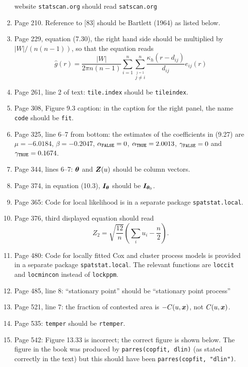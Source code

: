\documentclass[12pt,a4paper]{article}
\newcommand{\boldmaths}[1]{{\ensuremath\boldsymbol{#1}}}
\newcommand{\bx}{\boldmaths x}
\newcommand{\bZ}{\boldmaths Z}
\newcommand{\btheta}{\boldmaths\theta}
\newcommand{\suminej}{\sum_{i=1}^n \sum_{\stackrel{j=1}{\!\!j \neq i}}^n}
\begin{document}
\begin{enumerate}
 website \texttt{statscan.org} should read \texttt{satscan.org}
\item Page 210. Reference to [83] should be Bartlett (1964)
  as listed below.
\item Page 229, equation (7.30), the right hand side should
  be multiplied by $|W|/(n(n-1))$, so that the equation reads
  \[
  \widehat g(r) = \frac {|W|}{2\pi n(n-1)}
  \suminej \frac{
    \kappa_h(r - d_{ij})
  }{
    d_{ij}
  } e_{ij}(r)
  \]
\item Page 261, line 2 of text: 
\texttt{tile.index} should be \texttt{tileindex}.
\item Page 308, Figure 9.3 caption: in the caption for the right panel,
the name \texttt{code} should be \texttt{fit}.
\item Page 325, line 6--7 from bottom: the estimates of the coefficients
  in (9.27) are $\mu =-6.0184$, $\beta=-0.2047$,
  $\alpha_{\mbox{\scriptsize \texttt{FALSE}}} = 0$,
  $\alpha_{\mbox{\scriptsize \texttt{TRUE}}} = 2.0013$,
  $\gamma_{\mbox{\scriptsize \texttt{FALSE}}} = 0$ and
  $\gamma_{\mbox{\scriptsize \texttt{TRUE}}} = 0.1674$.
\item Page 344, lines 6--7: $\btheta$ and $\bZ(u)$ 
should be column vectors.
\item Page 374, in equation (10.3), ${\boldmaths I}_\btheta$
  should be ${\boldmaths I}_{\btheta_0}$.
\item Page 365: Code for local likelihood is in a separate package
  \texttt{spatstat.local}.
\item Page 376, third displayed equation should read
  \[
       Z_2 = \sqrt{\frac{12}{n}} \left(\sum_i u_i - \frac n 2\right).
  \]
\item Page 480: Code for locally fitted Cox and cluster process models
  is provided in a separate package \texttt{spatstat.local}.
  The relevant functions are \texttt{loccit} and \texttt{locmincon}
  instead of \texttt{lockppm}.
\item Page 485, line 8: ``stationary point'' should be
  ``stationary point process''
\item Page 521, line 7: the fraction of contested area is $-C(u, \bx)$,
not $C(u,\bx)$.
\item Page 535: \texttt{temper} should be \texttt{rtemper}.
\item Page 542: Figure 13.33 is incorrect; the correct figure is shown
  below. The figure in the book was produced by \texttt{parres(copfit, dlin)}
  (as stated correctly in the text)
  but this should have been \texttt{parres(copfit, "dlin")}.


\end{enumerate}
\end{document}
